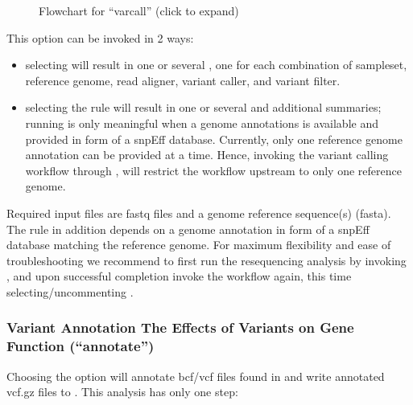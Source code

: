 \documentclass[letterpaper,10pt,english]{sphinxhowto}
\let\sphinxpxdimen\pdfpxdimen\else\newdimen\sphinxpxdimen
\begin{document}
\begin{figure}[htbp]
\centering
\capstart

\noindent\sphinxincludegraphics[height=800\sphinxpxdimen]{{dna-proto-workflow-varcall-11}.png}
\caption{Flowchart for “varcall” (click to expand)}\label{\detokenize{index:id11}}\end{figure}

This option can be invoked in 2 ways:
\begin{itemize}
\item {} 
selecting  will result in one or several , one for each combination of sample\sphinxhyphen{}set, reference genome, read aligner, variant caller, and variant filter.

\item {} 
selecting the rule  will result in one or several  and additional summaries; running   is only meaningful when a genome annotations is available and provided in form of a snpEff database. Currently, only one reference genome annotation can be provided at a time. Hence, invoking the variant calling workflow through , will restrict the  workflow upstream to only one reference genome.

\end{itemize}

Required input files are fastq files and a genome reference sequence(s) (fasta). The rule  in addition depends on a genome annotation in form of a snpEff database matching the reference genome. For maximum flexibility and ease of troubleshooting we recommend to first run the re\sphinxhyphen{}sequencing analysis by invoking , and upon successful completion invoke the workflow again, this time selecting/uncommenting .


\subsubsection{Variant Annotation \sphinxhyphen{} The Effects of Variants on Gene Function (“annotate”)}
\label{\detokenize{index:variant-annotation-the-effects-of-variants-on-gene-function-annotate}}
Choosing the option  will annotate bcf/vcf files found in  and write annotated vcf.gz files to . This analysis has only one step:
\end{document}

